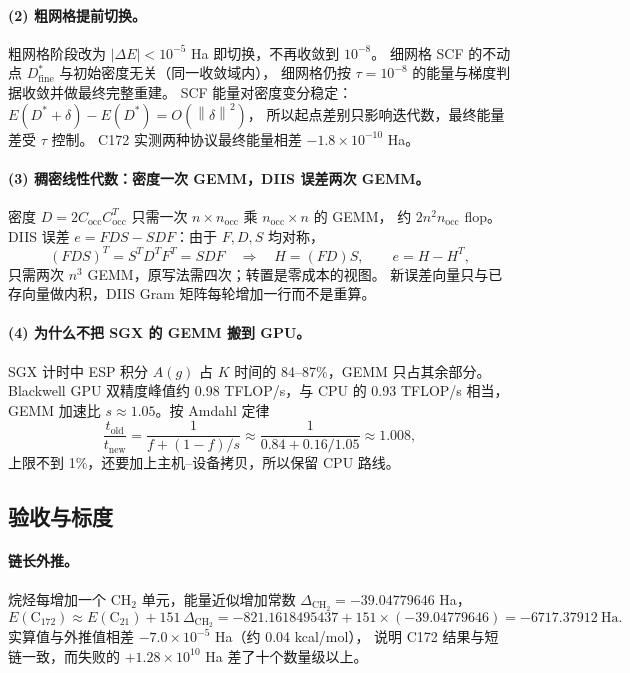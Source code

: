 \documentclass[UTF8,fontset=fandol,11pt,a4paper]{ctexart}
\numberwithin{equation}{section}
\newcommand{\norm}[1]{\left\lVert #1\right\rVert}
\begin{document}
\paragraph{(2) 粗网格提前切换。}
粗网格阶段改为 \(|\Delta E|<10^{-5}\) Ha 即切换，不再收敛到 \(10^{-8}\)。
细网格 SCF 的不动点 \(D^\ast_{\mathrm{fine}}\) 与初始密度无关（同一收敛域内），
细网格仍按 \(\tau=10^{-8}\) 的能量与梯度判据收敛并做最终完整重建。
SCF 能量对密度变分稳定：
\(E(D^\ast+\delta)-E(D^\ast)=O(\norm{\delta}^2)\)，
所以起点差别只影响迭代数，最终能量差受 \(\tau\) 控制。
C172 实测两种协议最终能量相差 \(-1.8\times10^{-10}\) Ha。

\paragraph{(3) 稠密线性代数：密度一次 GEMM，DIIS 误差两次 GEMM。}
密度 \(D=2C_{\mathrm{occ}}C_{\mathrm{occ}}^T\) 只需一次
\(n\times n_{\mathrm{occ}}\) 乘 \(n_{\mathrm{occ}}\times n\) 的 GEMM，
约 \(2n^2n_{\mathrm{occ}}\) flop。
DIIS 误差 \(e=FDS-SDF\)：由于 \(F,D,S\) 均对称，
\begin{equation}
(FDS)^T=S^TD^TF^T=SDF
\quad\Longrightarrow\quad
H=(FD)S,\qquad e=H-H^T,
\end{equation}
只需两次 \(n^3\) GEMM，原写法需四次；转置是零成本的视图。
新误差向量只与已存向量做内积，DIIS Gram 矩阵每轮增加一行而不是重算。

\paragraph{(4) 为什么不把 SGX 的 GEMM 搬到 GPU。}
SGX 计时中 ESP 积分 \(A(g)\) 占 \(K\) 时间的 84--87\%，GEMM 只占其余部分。
Blackwell GPU 双精度峰值约 0.98 TFLOP/s，与 CPU 的 0.93 TFLOP/s 相当，
GEMM 加速比 \(s\approx1.05\)。按 Amdahl 定律
\begin{equation}
\frac{t_{\mathrm{old}}}{t_{\mathrm{new}}}
=\frac{1}{f+(1-f)/s}
\approx\frac{1}{0.84+0.16/1.05}\approx1.008 ,
\end{equation}
上限不到 1\%，还要加上主机--设备拷贝，所以保留 CPU 路线。

\subsection{验收与标度}
\label{sec:repair-validation}
\paragraph{链长外推。}
烷烃每增加一个 CH\(_2\) 单元，能量近似增加常数
\(\Delta_{\mathrm{CH_2}}=-39.04779646\) Ha，
\begin{equation}
E(\mathrm C_{172})\approx E(\mathrm C_{21})+151\,\Delta_{\mathrm{CH_2}}
=-821.1618495437+151\times(-39.04779646)
=-6717.37912\ \mathrm{Ha}.
\end{equation}
实算值与外推值相差 \(-7.0\times10^{-5}\) Ha（约 0.04 kcal/mol），
说明 C172 结果与短链一致，而失败的 \(+1.28\times10^{10}\) Ha 差了十个数量级以上。
\end{document}
